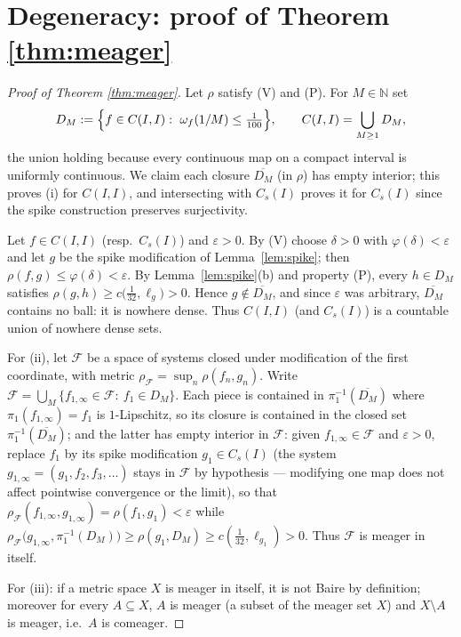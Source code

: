 \documentclass[11pt]{article}
\newcommand{\I}{I}
\newcommand{\Cs}{C_s(\I)}
\newcommand{\CI}{C(\I,\I)}
\begin{document}
\section{Degeneracy: proof of Theorem \ref{thm:meager}}\label{sec:meager}

\begin{proof}[Proof of Theorem \ref{thm:meager}]
Let $\rho$ satisfy (V) and (P).  For $M\in\mathbb N$ set
\[
D_M:=\Bigl\{f\in\CI:\ \omega_f(1/M)\le\tfrac1{100}\Bigr\},
\qquad
\CI=\bigcup_{M\ge1}D_M,
\]
the union holding because every continuous map on a compact interval is uniformly
continuous.  We claim each closure $\overline{D_M}$ (in $\rho$) has empty
interior; this proves (i) for $\CI$, and intersecting with $\Cs$ proves it for
$\Cs$ since the spike construction preserves surjectivity.

Let $f\in\CI$ (resp.\ $\Cs$) and $\varepsilon>0$.  By (V) choose $\delta>0$ with
$\varphi(\delta)<\varepsilon$ and let $g$ be the spike modification of
Lemma~\ref{lem:spike}; then $\rho(f,g)\le\varphi(\delta)<\varepsilon$.  By
Lemma~\ref{lem:spike}(b) and property (P), every $h\in D_M$ satisfies
$\rho(g,h)\ge c\bigl(\tfrac1{32},\ell_g\bigr)>0$.  Hence
$g\notin\overline{D_M}$, and since $\varepsilon$ was arbitrary,
$\overline{D_M}$ contains no ball: it is nowhere dense.  Thus $\CI$ (and $\Cs$) is
a countable union of nowhere dense sets.

For (ii), let $\mathcal F$ be a space of systems closed under modification of the
first coordinate, with metric
$\rho_{\mathcal F}=\sup_n\rho(f_n,g_n)$.  Write
$\mathcal F=\bigcup_M\{f_{1,\infty}\in\mathcal F:\ f_1\in D_M\}$.  Each piece is
contained in $\pi_1^{-1}(\overline{D_M})$ where $\pi_1(f_{1,\infty})=f_1$ is
$1$-Lipschitz, so its closure is contained in the closed set
$\pi_1^{-1}(\overline{D_M})$; and the latter has empty interior in $\mathcal F$:
given $f_{1,\infty}\in\mathcal F$ and $\varepsilon>0$, replace $f_1$ by its spike
modification $g_1\in\Cs$ (the system $g_{1,\infty}=(g_1,f_2,f_3,\dots)$ stays in
$\mathcal F$ by hypothesis --- modifying one map does not affect pointwise
convergence or the limit), so that
$\rho_{\mathcal F}(f_{1,\infty},g_{1,\infty})=\rho(f_1,g_1)<\varepsilon$ while
$\rho_{\mathcal F}\bigl(g_{1,\infty},\pi_1^{-1}(D_M)\bigr)\ge
\rho(g_1,D_M)\ge c(\tfrac1{32},\ell_{g_1})>0$.  Thus $\mathcal F$ is meager in
itself.

For (iii): if a metric space $X$ is meager in itself, it is not Baire by
definition; moreover for every $A\subseteq X$, $A$ is meager (a subset of the
meager set $X$) and $X\setminus A$ is meager, i.e.\ $A$ is comeager.
\end{proof}
\end{document}
